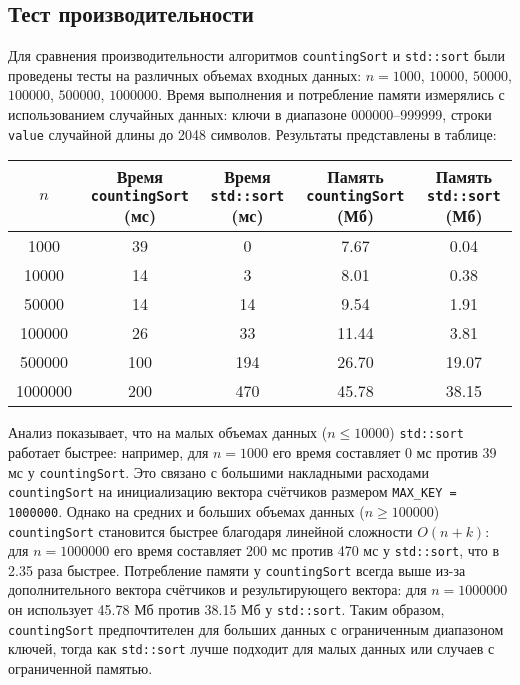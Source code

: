 \documentclass[12pt]{article}
\begin{document}
\subsection*{Тест производительности}

Для сравнения производительности алгоритмов \texttt{countingSort} и \texttt{std::sort} были проведены тесты на различных объемах входных данных: $n = 1000$, $10000$, $50000$, $100000$, $500000$, $1000000$. Время выполнения и потребление памяти измерялись с использованием случайных данных: ключи в диапазоне 000000--999999, строки \texttt{value} случайной длины до 2048 символов. Результаты представлены в таблице:

\begin{tabular}{|c|c|c|c|c|}
\hline
$n$       & Время \texttt{countingSort} (мс) & Время \texttt{std::sort} (мс) & Память \texttt{countingSort} (Мб) & Память \texttt{std::sort} (Мб) \\ \hline
1000      & 39                               & 0                             & 7.67                              & 0.04                           \\ 
10000     & 14                               & 3                             & 8.01                              & 0.38                           \\ 
50000     & 14                               & 14                            & 9.54                              & 1.91                           \\ 
100000    & 26                               & 33                            & 11.44                             & 3.81                           \\ 
500000    & 100                              & 194                           & 26.70                             & 19.07                          \\ 
1000000   & 200                              & 470                           & 45.78                             & 38.15                          \\ \hline
\end{tabular}

Анализ показывает, что на малых объемах данных ($n \leq 10000$) \texttt{std::sort} работает быстрее: например, для $n = 1000$ его время составляет 0 мс против 39 мс у \texttt{countingSort}. Это связано с большими накладными расходами \texttt{countingSort} на инициализацию вектора счётчиков размером \texttt{MAX\_KEY = 1000000}. Однако на средних и больших объемах данных ($n \geq 100000$) \texttt{countingSort} становится быстрее благодаря линейной сложности $O(n + k)$: для $n = 1000000$ его время составляет 200 мс против 470 мс у \texttt{std::sort}, что в 2.35 раза быстрее. Потребление памяти у \texttt{countingSort} всегда выше из-за дополнительного вектора счётчиков и результирующего вектора: для $n = 1000000$ он использует 45.78 Мб против 38.15 Мб у \texttt{std::sort}. Таким образом, \texttt{countingSort} предпочтителен для больших данных с ограниченным диапазоном ключей, тогда как \texttt{std::sort} лучше подходит для малых данных или случаев с ограниченной памятью.
\end{document}
